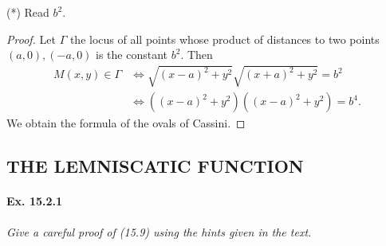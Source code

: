 \documentclass[11pt,a4paper]{article}
\begin{document}
(*) Read $b^2$.

\begin{proof}
Let $\Gamma$ the locus of all points whose product of distances to two points $(a,0),(-a,0)$ is the constant $b^2$. Then
\begin{align*}
M(x,y) \in \Gamma & \iff \sqrt{(x-a)^2 + y^2}   \sqrt{(x+a)^2 + y^2}  = b^2\\
&\iff ((x-a)^2 + y^2)((x-a)^2 + y^2) = b^4.
\end{align*}
We obtain the formula of the ovals of Cassini.
\end{proof}


\subsection{THE LEMNISCATIC FUNCTION}
\paragraph{Ex. 15.2.1}{\it Give a careful proof of (15.9) using the hints given in the text.
}
\end{document}
